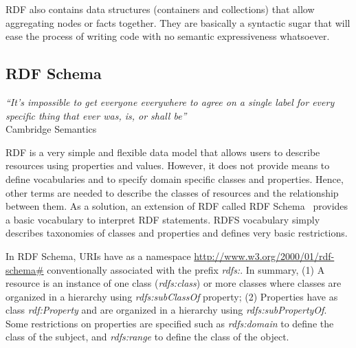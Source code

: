 RDF also contains data structures (containers and collections) that allow aggregating nodes or facts together. They are basically a syntactic sugar that will ease the process of writing code with no semantic expressiveness whatsoever.

\subsection{RDF Schema}

\begin{flushright}
\textit{``It's impossible to get everyone everywhere to agree on a single label for every specific thing that ever was, is, or shall be''}\\
Cambridge Semantics~\cite{Cambridge:RDF-101:13}
\end{flushright}

RDF is a very simple and flexible data model that allows users to describe resources using properties and values. However, it does not provide means to define vocabularies and to specify domain specific classes and properties. Hence, other terms are needed to describe the classes of resources and the relationship between them. As a solution, an extension of RDF called RDF Schema~\cite{Brickley:2014} provides a basic vocabulary to interpret RDF statements. RDFS vocabulary simply describes taxonomies of classes and properties and defines very basic restrictions.

In RDF Schema, URIs have as a namespace \url{http://www.w3.org/2000/01/rdf-schema#}
conventionally associated with the prefix \emph{rdfs:}. In summary, (1) A resource is an instance of one class (\emph{rdfs:class}) or more classes where classes are organized in a hierarchy using \emph{rdfs:subClassOf} property; (2) Properties have as class \emph{rdf:Property} and are organized in a hierarchy using \emph{rdfs:subPropertyOf}. Some restrictions on properties are specified such as \emph{rdfs:domain} to define the class of the subject, and \emph{rdfs:range} to define the class of the object.

